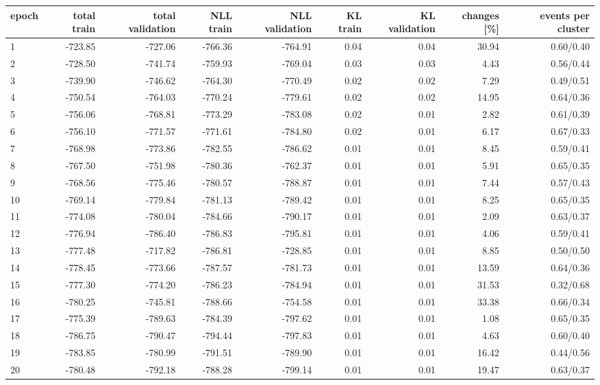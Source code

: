 \begin{tabular}{lrrrrrrrr}
\hline
epoch & total train & total validation & NLL train & NLL validation & KL train & KL validation & changes [\%] & events per cluster \\
\hline
1 & -723.85 & -727.06 & -766.36 & -764.91 & 0.04 & 0.04 & 30.94 & 0.60/0.40 \\
2 & -728.50 & -741.74 & -759.93 & -769.04 & 0.03 & 0.03 & 4.43 & 0.56/0.44 \\
3 & -739.90 & -746.62 & -764.30 & -770.49 & 0.02 & 0.02 & 7.29 & 0.49/0.51 \\
4 & -750.54 & -764.03 & -770.24 & -779.61 & 0.02 & 0.02 & 14.95 & 0.64/0.36 \\
5 & -756.06 & -768.81 & -773.29 & -783.08 & 0.02 & 0.01 & 2.82 & 0.61/0.39 \\
6 & -756.10 & -771.57 & -771.61 & -784.80 & 0.02 & 0.01 & 6.17 & 0.67/0.33 \\
7 & -768.98 & -773.86 & -782.55 & -786.62 & 0.01 & 0.01 & 8.45 & 0.59/0.41 \\
8 & -767.50 & -751.98 & -780.36 & -762.37 & 0.01 & 0.01 & 5.91 & 0.65/0.35 \\
9 & -768.56 & -775.46 & -780.57 & -788.87 & 0.01 & 0.01 & 7.44 & 0.57/0.43 \\
10 & -769.14 & -779.84 & -781.13 & -789.42 & 0.01 & 0.01 & 8.25 & 0.65/0.35 \\
11 & -774.08 & -780.04 & -784.66 & -790.17 & 0.01 & 0.01 & 2.09 & 0.63/0.37 \\
12 & -776.94 & -786.40 & -786.83 & -795.81 & 0.01 & 0.01 & 4.06 & 0.59/0.41 \\
13 & -777.48 & -717.82 & -786.81 & -728.85 & 0.01 & 0.01 & 8.85 & 0.50/0.50 \\
14 & -778.45 & -773.66 & -787.57 & -781.73 & 0.01 & 0.01 & 13.59 & 0.64/0.36 \\
15 & -777.30 & -774.20 & -786.23 & -784.94 & 0.01 & 0.01 & 31.53 & 0.32/0.68 \\
16 & -780.25 & -745.81 & -788.66 & -754.58 & 0.01 & 0.01 & 33.38 & 0.66/0.34 \\
17 & -775.39 & -789.63 & -784.39 & -797.62 & 0.01 & 0.01 & 1.08 & 0.65/0.35 \\
18 & -786.75 & -790.47 & -794.44 & -797.83 & 0.01 & 0.01 & 4.63 & 0.60/0.40 \\
19 & -783.85 & -780.99 & -791.51 & -789.90 & 0.01 & 0.01 & 16.42 & 0.44/0.56 \\
20 & -780.48 & -792.18 & -788.28 & -799.14 & 0.01 & 0.01 & 19.47 & 0.63/0.37 \\

\end{tabular}
